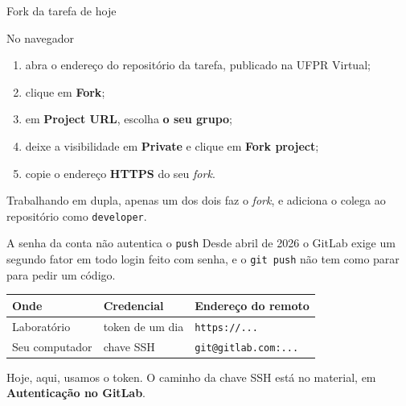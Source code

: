 \documentclass{beamer}
\newenvironment{nonavegador}
  {\begin{exampleblock}{No navegador}}
  {\end{exampleblock}}
\begin{document}
\begin{frame}{Fork da tarefa de hoje}
  \begin{nonavegador}
    \begin{enumerate}
      \item abra o endereço do repositório da tarefa, publicado na UFPR Virtual;
      \item clique em \textbf{Fork};
      \item em \textbf{Project URL}, escolha \textbf{o seu grupo};
      \item deixe a visibilidade em \textbf{Private} e clique em
            \textbf{Fork project};
      \item copie o endereço \textbf{HTTPS} do seu \textit{fork}.
    \end{enumerate}
  \end{nonavegador}

  \vspace{0.4cm}
  Trabalhando em dupla, apenas um dos dois faz o \textit{fork}, e adiciona o
  colega ao repositório como \texttt{developer}.
\end{frame}

\begin{frame}{A senha da conta não autentica o \texttt{push}}
  Desde abril de 2026 o GitLab exige um segundo fator em todo login feito com
  senha, e o \texttt{git push} não tem como parar para pedir um código.

  \vspace{0.4cm}
  \begin{center}
    \small
    \begin{tabular}{lll}
      \toprule
      \textbf{Onde} & \textbf{Credencial} & \textbf{Endereço do remoto} \\
      \midrule
      Laboratório & token de um dia & \texttt{https://...} \\
      Seu computador & chave SSH & \texttt{git@gitlab.com:...} \\
      \bottomrule
    \end{tabular}
  \end{center}

  \vspace{0.4cm}
  Hoje, aqui, usamos o token. O caminho da chave SSH está no material, em
  \textbf{Autenticação no GitLab}.
\end{frame}
\end{document}
